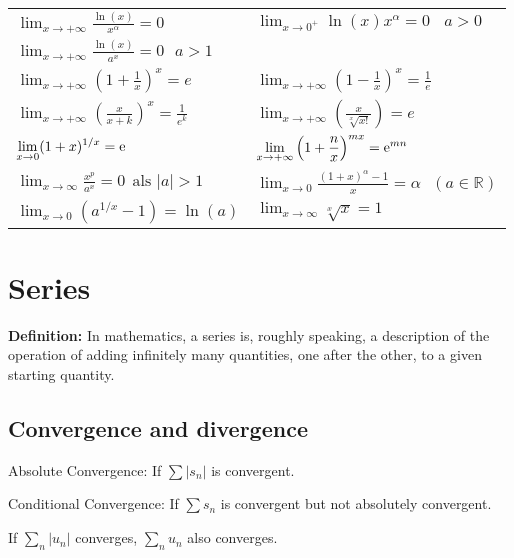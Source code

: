 \begin{tabularx}{\textwidth}{ X X }
$ \displaystyle \lim_{x\rightarrow+\infty}\frac{\ln(x)}{x^\alpha}=0 $ &
$ \displaystyle \lim_{x\rightarrow 0^+}\ln(x)x^\alpha=0 ~~~~ a>0 $ \\ [2ex]

$ \displaystyle \lim_{x\rightarrow+\infty}\frac{\ln(x)}{a^x}=0 ~~~ a>1$ \\ [2ex]

$ \displaystyle \lim_{x\rightarrow+\infty}\left(1+\frac{1}{x}\right)^x=e $ & 
$ \displaystyle \lim_{x\rightarrow+\infty}\left(1-\frac{1}{x}\right)^x=\frac{1}{e} $ \\ [2ex]

$ \displaystyle \lim_{x\rightarrow+\infty}\left(\frac{x}{x+k}\right)^x=\frac{1}{e^k} $ & 
$ \displaystyle \lim_{x\rightarrow+\infty}\left(\frac{x}{ \sqrt[x]{x!} }\right)=e $ \\ [2ex]

$ \displaystyle \lim_{x\rightarrow0}(1+x)^{1/x}={\rm e} $ &
$ \displaystyle \lim_{x\rightarrow+\infty}\left(1+\frac{n}{x}\right)^{mx}={\rm e}^{mn} $ \\ [2ex]

$ \displaystyle \lim_{x\rightarrow\infty}\frac{x^p}{a^x}=0~~\mbox{als }|a|>1 $ &
$ \displaystyle \lim_{x\rightarrow0}\frac{(1+x)^\alpha-1}{x}=\alpha ~~~ (a\in\mathbb{R}) $ \\ [2ex]

$ \displaystyle \lim_{x\rightarrow0}\left(a^{1/x}-1\right)=\ln(a) $ &
$ \displaystyle \lim_{x\rightarrow\infty}\sqrt[x]{x}=1 $ \\ [2ex]

\end{tabularx}

\section{Series}
\textbf{Definition:} In mathematics, a series is, roughly speaking, a description of the operation of adding infinitely many quantities, one after the other, to a given starting quantity.

\subsection{Convergence and divergence}
Absolute Convergence: If $\sum\left|s_n\right|$ is convergent.

Conditional Convergence: If $\sum s_n$ is convergent but not absolutely convergent.

If $\sum\limits_n|u_n|$ converges, $\sum\limits_n u_n$ also converges.

